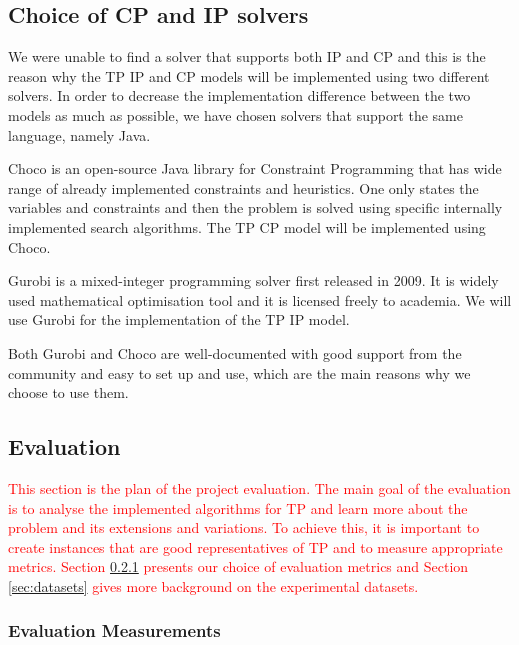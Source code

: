 \documentclass{mprop}
\theoremstyle{definition}
\begin{document}

\subsection{Choice of CP and IP solvers}
\label{sec:cpandisolvers}

We were unable to find a solver that supports both IP and CP and this is the reason why the TP IP and CP models will be implemented using two different solvers. In order to decrease the implementation difference between the two models as much as possible, we have chosen solvers that support the same language, namely  Java.

Choco \citep{choco} is an open-source Java library for Constraint Programming that has wide range of already implemented constraints and heuristics. One only states the variables and constraints and then the problem is solved using specific internally implemented search algorithms. The TP CP model will be implemented using Choco.

Gurobi is a mixed-integer programming solver first released in 2009. It is widely used mathematical optimisation tool \citep{gurobiusage} and it is licensed freely to academia. We will use Gurobi for the implementation of the TP IP model.

Both Gurobi and Choco are well-documented with good support from the community and easy to set up and use, which are the main reasons why we choose to use them.

\subsection{Evaluation}
\label{sec:evaluation}

\textcolor{red}{
This section is the plan of the project evaluation. The main goal of the evaluation is to analyse the implemented algorithms for TP and learn more about the problem and its extensions and variations. To achieve this, it is important to create instances that are good representatives of TP and to measure appropriate metrics. 
Section \ref{sec:evaluationgoals} presents our choice of evaluation metrics and Section \ref{sec:datasets} gives more background on the experimental datasets. %
}

\subsubsection{Evaluation Measurements}
\label{sec:evaluationgoals}
\end{document}
